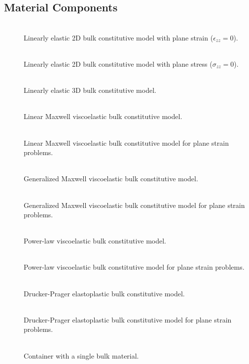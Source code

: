 \subsection{Material Components}
\begin{description}
\item [] \\
Linearly elastic 2D bulk constitutive model with plane strain ($\epsilon_{zz}=0$).
\item [] \\
Linearly elastic 2D bulk constitutive model with plane stress ($\sigma_{zz}=0$).
\item [] \\
Linearly elastic 3D bulk constitutive model.
\item [] \\
Linear Maxwell viscoelastic bulk constitutive model.
\item [] \\
Linear Maxwell viscoelastic bulk constitutive model for plane strain
problems.
\item [] \\
Generalized Maxwell viscoelastic bulk constitutive model.
\item [] \\
Generalized Maxwell viscoelastic bulk constitutive model for plane
strain problems.
\item [] \\
Power-law viscoelastic bulk constitutive model.
\item [] \\
Power-law viscoelastic bulk constitutive model for plane strain problems.
\item [] \\
Drucker-Prager elastoplastic bulk constitutive model.
\item [] \\
Drucker-Prager elastoplastic bulk constitutive model for plane strain
problems.
\item [] \\
Container with a single bulk material.
\end{description}

